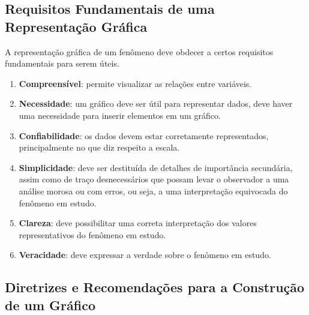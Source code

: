 \subsection{Requisitos Fundamentais de uma Representação Gráfica}

A representação gráfica de um fenômeno deve obdecer a certos
requisitos fundamentais para serem úteis.

\begin{enumerate}

\item \textbf{Compreensível}: permite visualizar as relações entre variáveis.
\item \textbf{Necessidade}: um gráfico deve ser útil para representar dados, deve haver uma necessidade para inserir elementos em um gráfico.
\item \textbf{Confiabilidade}: os dados devem estar corretamente representados, principalmente no que diz respeito a escala.
\item \textbf{Simplicidade}: deve ser destituída de detalhes de
importância secundária, assim como de traço desnecessários que
possam levar o observador a uma análise morosa ou com erros, ou
seja, a uma interpretação equivocada do fenômeno em estudo. \item
\textbf{Clareza}: deve possibilitar uma correta interpretação dos
valores representativos do fenômeno em estudo. \item
\textbf{Veracidade}: deve expressar a verdade sobre o fenômeno em
estudo.
\end{enumerate}


\newpage
\subsection{Diretrizes e Recomendações para a Construção de um Gráfico}


